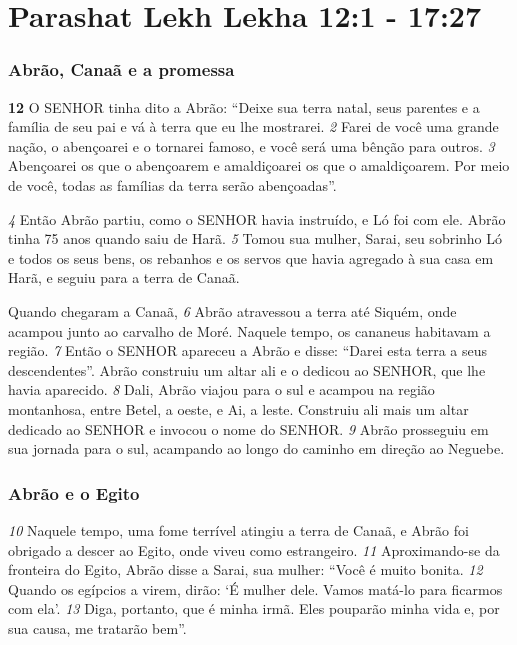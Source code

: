 \section*{Parashat Lekh Lekha 12:1 - 17:27}

\subsubsection*{Abrão, Canaã e a promessa}
\textbf{\large 12}
 O SENHOR tinha dito a Abrão: “Deixe sua terra natal, seus parentes e a
família de seu pai e vá à terra que eu lhe mostrarei. 
\textit{\tiny 2}
Farei de você uma grande
nação, o abençoarei e o tornarei famoso, e você será uma bênção para outros.
\textit{\tiny 3}
Abençoarei os que o abençoarem e amaldiçoarei os que o amaldiçoarem. Por
meio de você, todas as famílias da terra serão abençoadas”.

\bigskip
\textit{\tiny 4}
Então Abrão partiu, como o SENHOR havia instruído, e Ló foi com ele. Abrão
tinha 75 anos quando saiu de Harã. 
\textit{\tiny 5}
Tomou sua mulher, Sarai, seu sobrinho Ló e
todos os seus bens, os rebanhos e os servos que havia agregado à sua casa em
Harã, e seguiu para a terra de Canaã. 

\bigskip
Quando chegaram a Canaã, 
\textit{\tiny 6}
Abrão
atravessou a terra até Siquém, onde acampou junto ao carvalho de Moré. Naquele
tempo, os cananeus habitavam a região.
\textit{\tiny 7}
Então o SENHOR apareceu a Abrão e disse: “Darei esta terra a seus
descendentes”. Abrão construiu um altar ali e o dedicou ao SENHOR, que lhe havia
aparecido. 
\textit{\tiny 8}
Dali, Abrão viajou para o sul e acampou na região montanhosa, entre
Betel, a oeste, e Ai, a leste. Construiu ali mais um altar dedicado ao SENHOR e
invocou o nome do SENHOR. 
\textit{\tiny 9}
Abrão prosseguiu em sua jornada para o sul,
acampando ao longo do caminho em direção ao Neguebe.

\bigskip
\subsubsection*{Abrão e o Egito}
\textit{\tiny 10}
Naquele tempo, uma fome terrível atingiu a terra de Canaã, e Abrão foi
obrigado a descer ao Egito, onde viveu como estrangeiro. 
\textit{\tiny 11}
Aproximando-se da
fronteira do Egito, Abrão disse a Sarai, sua mulher: “Você é muito bonita.
\textit{\tiny 12}
Quando os egípcios a virem, dirão: ‘É mulher dele. Vamos matá-lo para ficarmos
com ela’. 
\textit{\tiny 13}
Diga, portanto, que é minha irmã. Eles pouparão minha vida e, por sua
causa, me tratarão bem”.

